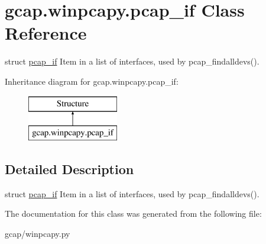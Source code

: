 \hypertarget{classgcap_1_1winpcapy_1_1pcap__if}{}\section{gcap.\+winpcapy.\+pcap\+\_\+if Class Reference}
\label{classgcap_1_1winpcapy_1_1pcap__if}


struct \hyperlink{classgcap_1_1winpcapy_1_1pcap__if}{pcap\+\_\+if} Item in a list of interfaces, used by pcap\+\_\+findalldevs().  


Inheritance diagram for gcap.\+winpcapy.\+pcap\+\_\+if\+:\begin{figure}[H]
\begin{center}
\leavevmode
\includegraphics[height=2.000000cm]{d1/d44/classgcap_1_1winpcapy_1_1pcap__if}
\end{center}
\end{figure}


\subsection{Detailed Description}
struct \hyperlink{classgcap_1_1winpcapy_1_1pcap__if}{pcap\+\_\+if} Item in a list of interfaces, used by pcap\+\_\+findalldevs(). 



The documentation for this class was generated from the following file\+:\begin{DoxyCompactItemize}
\item 
gcap/winpcapy.\+py\end{DoxyCompactItemize}
